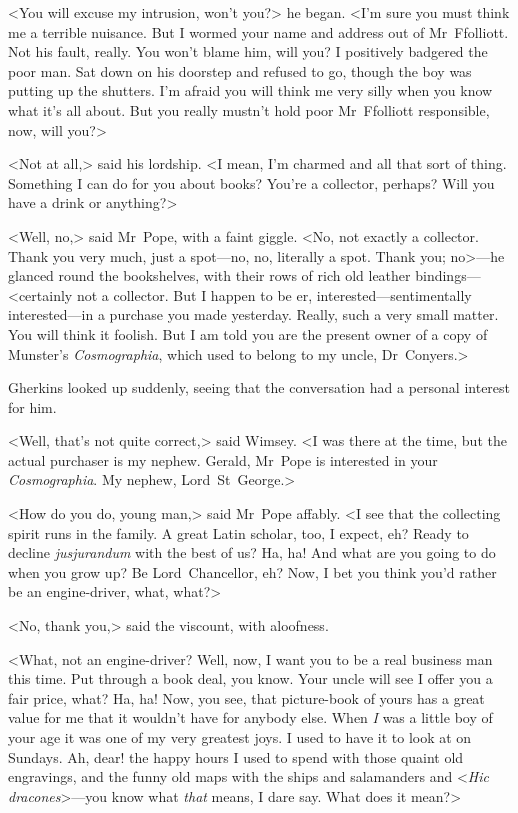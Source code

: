 <You will excuse my intrusion, won't you?> he began. <I'm sure you must think me a terrible nuisance. But I wormed your name and address out of Mr~Ffolliott. Not his fault, really. You won't blame him, will you? I positively badgered the poor man. Sat down on his doorstep and refused to go, though the boy was putting up the shutters. I'm afraid you will think me very silly when you know what it's all about. But you really mustn't hold poor Mr~Ffolliott responsible, now, will you?>

<Not at all,> said his lordship. <I mean, I'm charmed and all that sort of thing. Something I can do for you about books? You're a collector, perhaps? Will you have a drink or anything?>

<Well, no,> said Mr~Pope, with a faint giggle. <No, not exactly a collector. Thank you very much, just a spot—no, no, literally a spot. Thank you; no>—he glanced round the bookshelves, with their rows of rich old leather bindings—<certainly not a collector. But I happen to be er, interested—sentimentally interested—in a purchase you made yesterday. Really, such a very small matter. You will think it foolish. But I am told you are the present owner of a copy of Munster's \textit{Cosmographia}, which used to belong to my uncle, Dr~Conyers.>

Gherkins looked up suddenly, seeing that the conversation had a personal interest for him.

<Well, that's not quite correct,> said Wimsey. <I was there at the time, but the actual purchaser is my nephew. Gerald, Mr~Pope is interested in your \textit{Cosmographia}. My nephew, Lord~St~George.>

<How do you do, young man,> said Mr~Pope affably. <I see that the collecting spirit runs in the family. A great Latin scholar, too, I expect, eh? Ready to decline \textit{jusjurandum} with the best of us? Ha, ha! And what are you going to do when you grow up? Be Lord~Chancellor, eh? Now, I bet you think you'd rather be an engine-driver, what, what?>

<No, thank you,> said the viscount, with aloofness.

<What, not an engine-driver? Well, now, I want you to be a real business man this time. Put through a book deal, you know. Your uncle will see I offer you a fair price, what? Ha, ha! Now, you see, that picture-book of yours has a great value for me that it wouldn't have for anybody else. When \textit{I} was a little boy of your age it was one of my very greatest joys. I used to have it to look at on Sundays. Ah, dear! the happy hours I used to spend with those quaint old engravings, and the funny old maps with the ships and salamanders and <\textit{Hic dracones}>—you know what \textit{that} means, I dare say. What does it mean?>

